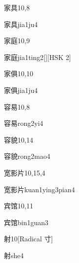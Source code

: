 \begin{entry}{家具}{10,8}
  \begin{phonetics}{家具}{jia1ju4}
  \end{phonetics}
\end{entry}

\begin{entry}{家庭}{10,9}
  \begin{phonetics}{家庭}{jia1ting2}[][HSK 2]
  \end{phonetics}
\end{entry}

\begin{entry}{家俱}{10,10}
  \begin{phonetics}{家俱}{jia1ju4}
  \end{phonetics}
\end{entry}

\begin{entry}{容易}{10,8}
  \begin{phonetics}{容易}{rong2yi4}
  \end{phonetics}
\end{entry}

\begin{entry}{容貌}{10,14}
  \begin{phonetics}{容貌}{rong2mao4}
  \end{phonetics}
\end{entry}

\begin{entry}{宽影片}{10,15,4}
  \begin{phonetics}{宽影片}{kuan1ying3pian4}
  \end{phonetics}
\end{entry}

\begin{entry}{宾馆}{10,11}
  \begin{phonetics}{宾馆}{bin1guan3}
  \end{phonetics}
\end{entry}

\begin{entry}{射}{10}[Radical 寸]
  \begin{phonetics}{射}{she4}
  \end{phonetics}
\end{entry}

